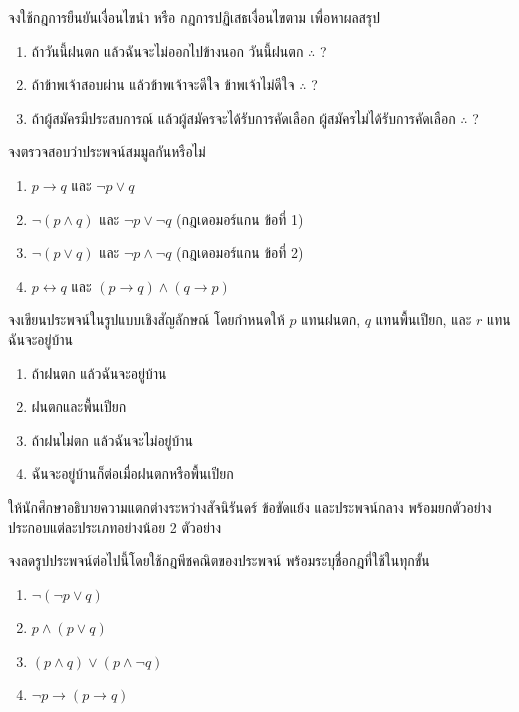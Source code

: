 \begin{exercise}
จงใช้กฎการยืนยันเงื่อนไขนำ หรือ กฎการปฏิเสธเงื่อนไขตาม เพื่อหาผลสรุป
\begin{enumerate}
    \item ถ้าวันนี้ฝนตก แล้วฉันจะไม่ออกไปข้างนอก วันนี้ฝนตก $\therefore$ ?
    \item ถ้าข้าพเจ้าสอบผ่าน แล้วข้าพเจ้าจะดีใจ ข้าพเจ้าไม่ดีใจ $\therefore$ ?
    \item ถ้าผู้สมัครมีประสบการณ์ แล้วผู้สมัครจะได้รับการคัดเลือก ผู้สมัครไม่ได้รับการคัดเลือก $\therefore$ ?
\end{enumerate}
\end{exercise}

\begin{exercise}
จงตรวจสอบว่าประพจน์สมมูลกันหรือไม่
\begin{enumerate}
    \item $p \rightarrow q$ และ $\neg p \lor q$
    \item $\neg(p \land q)$ และ $\neg p \lor \neg q$ (กฎเดอมอร์แกน ข้อที่ 1)
    \item $\neg(p \lor q)$ และ $\neg p \land \neg q$ (กฎเดอมอร์แกน ข้อที่ 2)
    \item $p \leftrightarrow q$ และ $(p \rightarrow q) \land (q \rightarrow p)$
\end{enumerate}
\end{exercise}

\begin{exercise}
จงเขียนประพจน์ในรูปแบบเชิงสัญลักษณ์ โดยกำหนดให้ $p$ แทนฝนตก, $q$ แทนพื้นเปียก, และ $r$ แทนฉันจะอยู่บ้าน
\begin{enumerate}
    \item ถ้าฝนตก แล้วฉันจะอยู่บ้าน
    \item ฝนตกและพื้นเปียก
    \item ถ้าฝนไม่ตก แล้วฉันจะไม่อยู่บ้าน
    \item ฉันจะอยู่บ้านก็ต่อเมื่อฝนตกหรือพื้นเปียก
\end{enumerate}
\end{exercise}

\begin{exercise}
ให้นักศึกษาอธิบายความแตกต่างระหว่างสัจนิรันดร์ ข้อขัดแย้ง และประพจน์กลาง พร้อมยกตัวอย่างประกอบแต่ละประเภทอย่างน้อย 2 ตัวอย่าง
\end{exercise}

\begin{exercise}
จงลดรูปประพจน์ต่อไปนี้โดยใช้กฎพีชคณิตของประพจน์ พร้อมระบุชื่อกฎที่ใช้ในทุกขั้น
\begin{enumerate}
    \item $\neg(\neg p \lor q)$
    \item $p \land (p \lor q)$
    \item $(p \land q) \lor (p \land \neg q)$
    \item $\neg p \rightarrow (p \rightarrow q)$
\end{enumerate}
\end{exercise}


